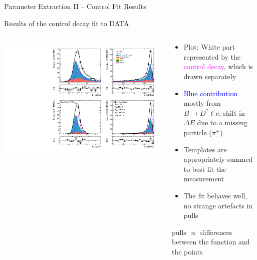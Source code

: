 \documentclass[serif]{beamer}
\begin{document}

\begin{frame}[t]{Parameter Extraction II -- Control Fit Results}
\vspace{-3mm}
\small

Results of the control decay fit to DATA

\begin{columns}
	\vspace{-2mm}
	\begin{center}
		\includegraphics[width=\textwidth]{fig/cs_fit_data}
	\end{center}
	
	\begin{block}{}
		\begin{itemize}
			\item Plot: White part represented by the \textcolor{magenta}{control decay}, which is drawn separately
			\item \textcolor{blue}{Blue contribution} mostly from $B \to D^* \ell \nu$, shift in $\Delta E$ due to a missing particle ($\pi^\pm$)
			\item Templates are appropriately summed to best fit the measurement
			\item The fit behaves well, no strange artefacts in pulls 
		\end{itemize}
	{\tiny pulls $\propto$ differences between the function and the points}
	\end{block}
\end{columns}


\end{frame}
\end{document}
